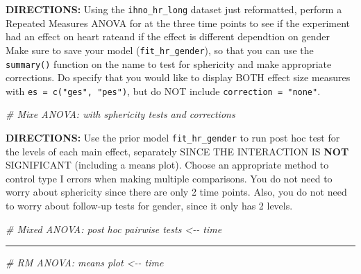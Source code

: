 \documentclass[
]{article}
\newenvironment{Shaded}{\begin{snugshade}}{\end{snugshade}}
\newcommand{\CommentTok}[1]{\textcolor[rgb]{0.56,0.35,0.01}{\textit{#1}}}
\begin{document}
\clearpage

\textbf{DIRECTIONS:} Using the \texttt{ihno\_hr\_long} dataset just
reformatted, perform a Repeated Measures ANOVA for at the three time
points to see if the experiment had an effect on heart rateand if the
effect is different dependtion on gender Make sure to save your model
(\texttt{fit\_hr\_gender}), so that you can use the \texttt{summary()}
function on the name to test for sphericity and make appropriate
corrections. Do specify that you would like to display BOTH effect size
measures with \texttt{es\ =\ c("ges",\ "pes")}, but do NOT include
\texttt{correction\ =\ "none"}.

\begin{Shaded}
\begin{Highlighting}[]
\CommentTok{\# Mixe ANOVA:  with sphericity tests and corrections}
\end{Highlighting}
\end{Shaded}

\clearpage

\textbf{DIRECTIONS:} Use the prior model \texttt{fit\_hr\_gender} to run
post hoc test for the levels of each main effect, separately SINCE THE
INTERACTION IS \textbf{NOT} SIGNIFICANT (including a means plot). Choose
an appropriate method to control type I errors when making multiple
comparisons. You do not need to worry about sphericity since there are
only 2 time points. Also, you do not need to worry about follow-up tests
for gender, since it only has 2 levels.

\begin{Shaded}
\begin{Highlighting}[]
\CommentTok{\# Mixed ANOVA: post hoc pairwise tests \textless{}{-}{-} time}
\end{Highlighting}
\end{Shaded}

\begin{center}\rule{0.5\linewidth}{0.5pt}\end{center}

\begin{Shaded}
\begin{Highlighting}[]
\CommentTok{\# RM ANOVA: means plot \textless{}{-}{-} time}
\end{Highlighting}
\end{Shaded}

\clearpage
\end{document}
